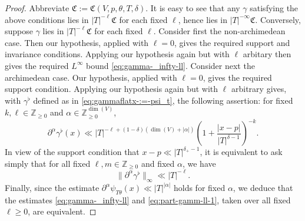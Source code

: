 \begin{proof}
  Abbreviate $\mathfrak{C} := \mathfrak{C}(V,p,\theta,T,\delta)$.  It is easy to see that any $\gamma$ satisfying the above conditions lies in $|T|^{-\ell} \mathfrak{C} $ for each fixed $\ell$, hence lies in $|T|^{-\infty} \mathfrak{C}$.  Conversely, suppose $\gamma$ lies in $|T|^{-\ell} \mathfrak{C}$ for each fixed $\ell$.  Consider first the non-archimedean case.  Then our hypothesis, applied with $\ell = 0$, gives the required support and invariance conditions.  Applying our hypothesis again but with $\ell$ arbitary then gives the required $L^\infty$ bound \eqref{eq:gamma-_infty-ll}.  Consider next the archimedean case.  Our hypothesis, applied with $\ell = 0$, gives the required support condition.  Applying our hypothesis again but with $\ell$ arbitrary gives, with $\gamma^{\flat}$ defined as in \eqref{eq:gammaflatx-:=-psi_t}, the following assertion: for fixed $k,\ell \in \mathbb{Z}_{\geq 0}$ and $\alpha \in \mathbb{Z}_{\geq 0}^{\dim(V)}$,
  \begin{equation*}
    \partial^\alpha \gamma^{\flat}(x) \ll
    |T|^{-\ell + (1 - \delta)(\dim(V) + |\alpha|)} \left( 1 + \frac{|x - p|}{|T|^{\delta - 1}} \right)^{-k}.
  \end{equation*}
  In view of the support condition that $x - p \ll |T|^{\delta_+ - 1}$, it is equivalent to ask simply that for all fixed $\ell, m \in \mathbb{Z}_{\geq 0}$ and fixed $\alpha$, we have
  \begin{equation}\label{eq:part-gamm-ll-1}
    \|\partial^\alpha \gamma^{\flat}\|_{\infty} \ll |T|^{-\ell}.
  \end{equation}
  Finally, since the estimate $\partial^\alpha \psi_{T \theta}(x) \ll |T|^{|\alpha|}$ holds for fixed $\alpha$, we deduce that the estimates \eqref{eq:gamma-_infty-ll} and \eqref{eq:part-gamm-ll-1}, taken over all fixed $\ell \geq 0$, are equivalent.
\end{proof}

